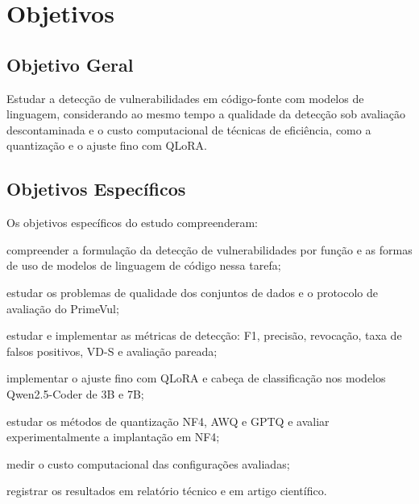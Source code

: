 \chapter{Objetivos}

\section{Objetivo Geral}

Estudar a detecção de vulnerabilidades em código-fonte com modelos de linguagem, considerando ao mesmo tempo a qualidade da detecção sob avaliação descontaminada e o custo computacional de técnicas de eficiência, como a quantização e o ajuste fino com QLoRA.

\section{Objetivos Específicos}

Os objetivos específicos do estudo compreenderam:

\begin{alineas}
    \item compreender a formulação da detecção de vulnerabilidades por função e as formas de uso de modelos de linguagem de código nessa tarefa;
    \item estudar os problemas de qualidade dos conjuntos de dados e o protocolo de avaliação do PrimeVul;
    \item estudar e implementar as métricas de detecção: F1, precisão, revocação, taxa de falsos positivos, VD-S e avaliação pareada;
    \item implementar o ajuste fino com QLoRA e cabeça de classificação nos modelos Qwen2.5-Coder de 3B e 7B;
    \item estudar os métodos de quantização NF4, AWQ e GPTQ e avaliar experimentalmente a implantação em NF4;
    \item medir o custo computacional das configurações avaliadas;
    \item registrar os resultados em relatório técnico e em artigo científico.
\end{alineas}
